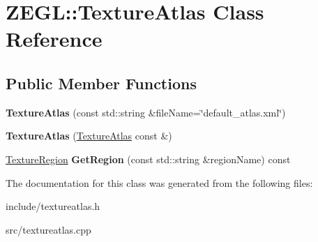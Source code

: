 \hypertarget{class_z_e_g_l_1_1_texture_atlas}{}\section{Z\+E\+G\+L\+:\+:Texture\+Atlas Class Reference}
\label{class_z_e_g_l_1_1_texture_atlas}
\subsection*{Public Member Functions}
\begin{DoxyCompactItemize}
\item 
\hypertarget{class_z_e_g_l_1_1_texture_atlas_ab33f5bce5ffa49c2d21f83603deed8df}{}{\bfseries Texture\+Atlas} (const std\+::string \&file\+Name=\char`\"{}default\+\_\+atlas.\+xml\char`\"{})\label{class_z_e_g_l_1_1_texture_atlas_ab33f5bce5ffa49c2d21f83603deed8df}

\item 
\hypertarget{class_z_e_g_l_1_1_texture_atlas_a578816352b07a4d79b21ca165c1ebe20}{}{\bfseries Texture\+Atlas} (\hyperlink{class_z_e_g_l_1_1_texture_atlas}{Texture\+Atlas} const \&)\label{class_z_e_g_l_1_1_texture_atlas_a578816352b07a4d79b21ca165c1ebe20}

\item 
\hypertarget{class_z_e_g_l_1_1_texture_atlas_a0113a9c98b3ce3aad33aa9861ad3f950}{}\hyperlink{struct_z_e_g_l_1_1_texture_region}{Texture\+Region} {\bfseries Get\+Region} (const std\+::string \&region\+Name) const \label{class_z_e_g_l_1_1_texture_atlas_a0113a9c98b3ce3aad33aa9861ad3f950}

\end{DoxyCompactItemize}


The documentation for this class was generated from the following files\+:\begin{DoxyCompactItemize}
\item 
include/textureatlas.\+h\item 
src/textureatlas.\+cpp\end{DoxyCompactItemize}
